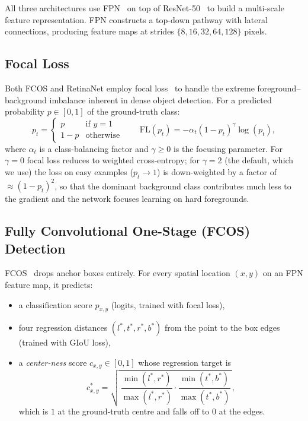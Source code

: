 \documentclass[11pt,a4paper]{article}
\begin{document}
All three architectures use FPN~\cite{lin2017feature} on top of ResNet-50~\cite{he2016deep} to build a multi-scale feature representation. FPN constructs a top-down pathway with lateral connections, producing feature maps at strides $\{8, 16, 32, 64, 128\}$ pixels.

\subsection{Focal Loss}

Both FCOS and RetinaNet employ focal loss~\cite{lin2017focal} to handle the extreme foreground--background imbalance inherent in dense object detection. For a predicted probability $p \in [0, 1]$ of the ground-truth class:
\begin{equation}
    p_t = \begin{cases} p & \text{if } y = 1 \\ 1 - p & \text{otherwise} \end{cases}
    \qquad
    \text{FL}(p_t) = -\alpha_t (1 - p_t)^{\gamma} \log(p_t),
\end{equation}
where $\alpha_t$ is a class-balancing factor and $\gamma \geq 0$ is the focusing parameter. For $\gamma = 0$ focal loss reduces to weighted cross-entropy; for $\gamma = 2$ (the default, which we use) the loss on easy examples ($p_t \to 1$) is down-weighted by a factor of $\approx (1 - p_t)^2$, so that the dominant background class contributes much less to the gradient and the network focuses learning on hard foregrounds.

\subsection{Fully Convolutional One-Stage (FCOS) Detection}

FCOS~\cite{tian2019fcos} drops anchor boxes entirely. For every spatial location $(x, y)$ on an FPN feature map, it predicts:
\begin{itemize}[nosep]
    \item a classification score $p_{x,y}$ (logits, trained with focal loss),
    \item four regression distances $(l^{\ast}, t^{\ast}, r^{\ast}, b^{\ast})$ from the point to the box edges (trained with GIoU loss),
    \item a \emph{center-ness} score $c_{x,y} \in [0,1]$ whose regression target is
    \begin{equation}
        c^{\ast}_{x,y} = \sqrt{\,\frac{\min(l^{\ast}, r^{\ast})}{\max(l^{\ast}, r^{\ast})} \cdot \frac{\min(t^{\ast}, b^{\ast})}{\max(t^{\ast}, b^{\ast})}\,},
    \end{equation}
    which is $1$ at the ground-truth centre and falls off to $0$ at the edges.
\end{itemize}
\end{document}
